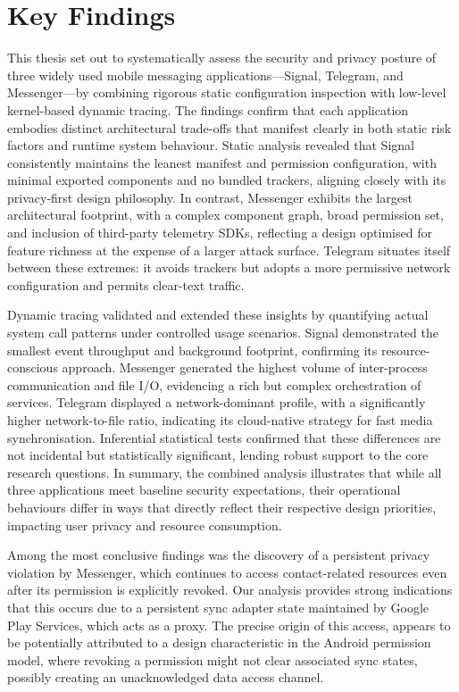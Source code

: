 \documentclass[a4paper,12pt]{report}
\begin{document}
\section{Key Findings}
This thesis set out to systematically assess the security and privacy posture of three widely used mobile messaging applications—Signal, Telegram, and Messenger—by combining rigorous static configuration inspection with low-level kernel-based dynamic tracing. The findings confirm that each application embodies distinct architectural trade-offs that manifest clearly in both static risk factors and runtime system behaviour. Static analysis revealed that Signal consistently maintains the leanest manifest and permission configuration, with minimal exported components and no bundled trackers, aligning closely with its privacy-first design philosophy. In contrast, Messenger exhibits the largest architectural footprint, with a complex component graph, broad permission set, and inclusion of third-party telemetry SDKs, reflecting a design optimised for feature richness at the expense of a larger attack surface. Telegram situates itself between these extremes: it avoids trackers but adopts a more permissive network configuration and permits clear-text traffic.

Dynamic tracing validated and extended these insights by quantifying actual system call patterns under controlled usage scenarios. Signal demonstrated the smallest event throughput and background footprint, confirming its resource-conscious approach. Messenger generated the highest volume of inter-process communication and file I/O, evidencing a rich but complex orchestration of services. Telegram displayed a network-dominant profile, with a significantly higher network-to-file ratio, indicating its cloud-native strategy for fast media synchronisation. Inferential statistical tests confirmed that these differences are not incidental but statistically significant, lending robust support to the core research questions. In summary, the combined analysis illustrates that while all three applications meet baseline security expectations, their operational behaviours differ in ways that directly reflect their respective design priorities, impacting user privacy and resource consumption.

Among the most conclusive findings was the discovery of a persistent privacy violation by Messenger, which continues to access contact-related resources even after its permission is explicitly revoked. Our analysis provides strong indications that this occurs due to a persistent sync adapter state maintained by Google Play Services, which acts as a proxy. The precise origin of this access, appears to be potentially attributed to a design characteristic in the Android permission model, where revoking a permission might not clear associated sync states, possibly creating an unacknowledged data access channel.
\end{document}
